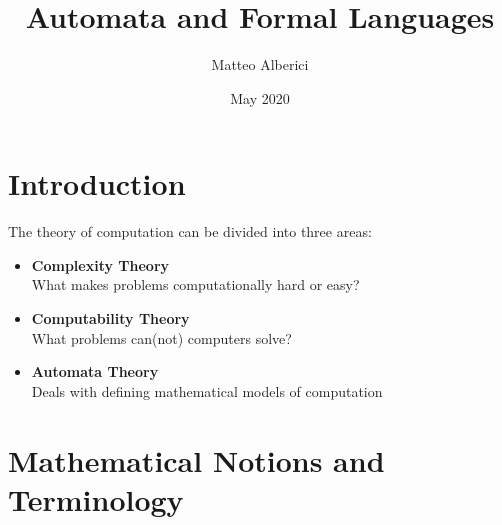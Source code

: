 \documentclass{article}
\title{Automata and Formal Languages}
\author{Matteo Alberici}
\date{May 2020}
\begin{document}
\maketitle
\newpage
\tableofcontents
\newpage

\section{Introduction}
The theory of computation can be divided into three areas: 
\begin{itemize}
    \item \textbf{Complexity Theory}
        \vspace{0.2cm} \\
        What makes problems computationally hard or easy?
    \item \textbf{Computability Theory}
        \vspace{0.2cm} \\
        What problems can(not) computers solve?
    \item \textbf{Automata Theory}
        \vspace{0.2cm} \\
        Deals with defining mathematical models of computation \\
\end{itemize}
\section{Mathematical Notions and Terminology}
\end{document}
